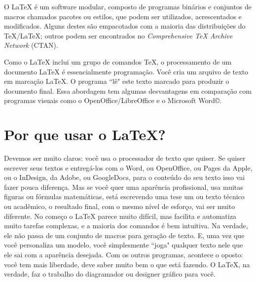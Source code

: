 \documentclass[a4paper,numbers=noenddot,abstract,DIV=calc]{scrbook} %
\begin{document}
O \LaTeX{} é um software modular, composto de programas binários e conjuntos de macros chamados pacotes ou estilos, que podem ser utilizados, acrescentados e modificados. Alguns destes são empacotados com a maioria das distribuições do TeX/\LaTeX; outros podem ser encontrados no \textit{Comprehensive TeX Archive Network} (CTAN).

Como o \LaTeX{} inclui um grupo de comandos TeX, o processamento de um documento \LaTeX{} é essencialmente programação. Você cria um arquivo de texto em marcação \LaTeX. O programa ``lê" este texto marcado para produzir o documento final.
Essa abordagem tem algumas desvantagens em comparação com programas visuais como o OpenOffice/LibreOffice e o Microsoft Word©.

\section{Por que usar o \LaTeX?}

Devemos ser muito claros: você usa o processador de texto que quiser. Se quiser escrever seus textos e entregá-los com o Word, ou OpenOffice, ou Pages da Apple, ou o InDesign, da Adobe, ou GoogleDocs, para o conteúdo do seu texto isso vai fazer pouca diferença. Mas se você quer uma aparência profissional, usa muitas figuras ou fórmulas matemáticas, está escrevendo uma tese um ou texto técnico ou acadêmico, o resultado final, com o mesmo nível de esforço, vai ser muito diferente. No começo o \LaTeX{} parece muito difícil, mas facilita e automatiza muito tarefas complexas, e a maioria dos comandos é bem intuitiva. Na verdade, ele não passa de um conjunto de macros para geração de texto. E, uma vez que você personaliza um modelo, você simplesmente ``joga" qualquer texto nele que ele sai com a aparência desejada. Com os outros programas, acontece o oposto: você tem mais liberdade, deve saber muito bem o que está fazendo. O \LaTeX{}, na verdade, faz o trabalho do diagramador ou designer gráfico para você.

\end{document}
